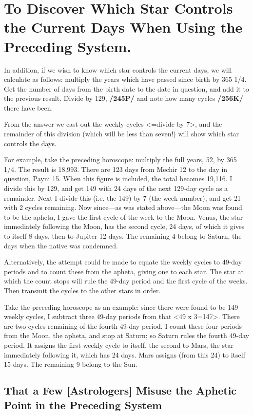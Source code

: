 \section{To Discover Which Star Controls the Current Days When Using the Preceding System.}

In addition, if we wish to know which star controls the current days, we will calculate as follows: multiply the years which have passed since birth by 365 1/4. Get the number of days from the birth date to
the date in question, and add it to the previous result. Divide by 129, \textbf{/245P/} and note how many cycles \textbf{/256K/} there have been. 

From the answer we cast out the weekly cycles <=divide by 7>, and the remainder of this division (which will be less than seven!) will show which star controls the days.

For example, take the preceding horoscope: multiply the full years, 52, by 365 1/4. The result is 18,993. There are 123 days from Mechir 12 to the day in question, Payni 15. When this figure is included, the total becomes 19,116. I divide this by 129, and get 149 with 24 days of the next 129-day cycle as a remainder. Next I divide this (i.e. the 149) by 7 (the week-number), and get 21 with 2 cycles remaining. Now since—as was stated above—the Moon was found to be the apheta, I gave the first cycle of the week to the Moon. Venus, the star immediately following the Moon, has the second cycle, 24 days, of which it gives to itself 8 days, then to Jupiter 12 days. The remaining 4 belong to Saturn, the days when the native was condemned.

Alternatively, the attempt could be made to equate the weekly cycles to 49-day periods and to count these from the apheta, giving one to each star. The star at which the count stops will rule the 49-day period and the first cycle of the weeks. Then transmit the cycles to the other stars in order. 

Take the preceding horoscope as an example: since there were found to be 149 weekly cycles, I subtract three 49-day periods from that <49 x 3=147>. There are two cycles remaining of the fourth 49-day period. I count these four periods from the Moon, the apheta, and stop at Saturn; so Saturn rules the fourth 49-day period. It assigns the first weekly cycle to itself, the second to Mars, the star immediately following it, which has 24 days. Mars assigns (from this 24) to itself 15 days. The remaining 9 belong to the Sun.

\subsection{That a Few [Astrologers] Misuse the Aphetic Point in the Preceding System}


